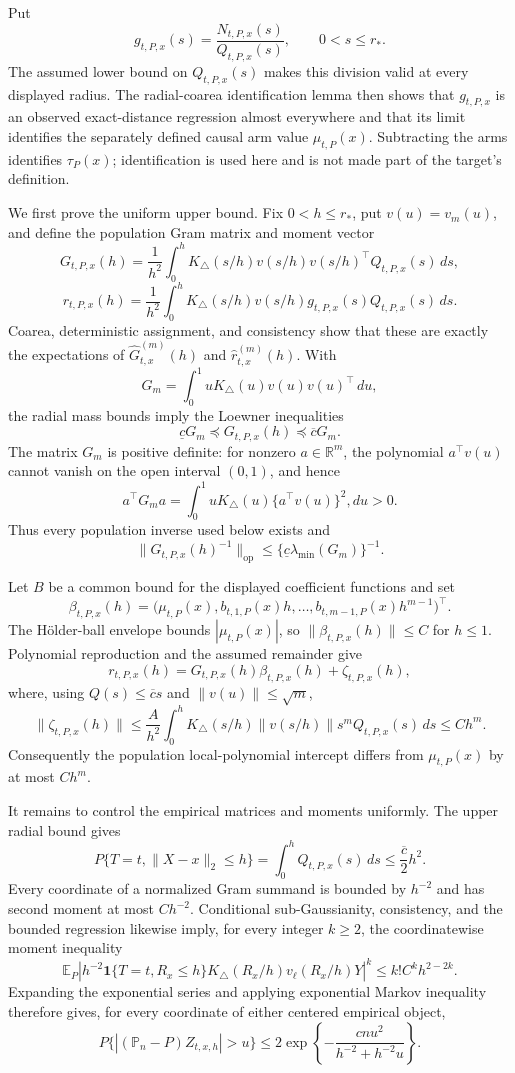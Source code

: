 Put
\[
 g_{t,P,x}(s)=\frac{N_{t,P,x}(s)}{Q_{t,P,x}(s)},
 \qquad 0<s\leq r_*.
\]
The assumed lower bound on \(Q_{t,P,x}(s)\) makes this division valid at every displayed radius.  The radial-coarea identification lemma then shows that \(g_{t,P,x}\) is an observed exact-distance regression almost everywhere and that its limit identifies the separately defined causal arm value \(\mu_{t,P}(x)\).  Subtracting the arms identifies \(\tau_P(x)\); identification is used here and is not made part of the target's definition.

We first prove the uniform upper bound.  Fix \(0<h\leq r_*\), put \(v(u)=v_m(u)\), and define the population Gram matrix and moment vector
\[
 G_{t,P,x}(h)=\frac1{h^2}\int_0^hK_\triangle(s/h)v(s/h)v(s/h)^\top Q_{t,P,x}(s)\,ds,
\]
\[
 r_{t,P,x}(h)=\frac1{h^2}\int_0^hK_\triangle(s/h)v(s/h)g_{t,P,x}(s)Q_{t,P,x}(s)\,ds.
\]
Coarea, deterministic assignment, and consistency show that these are exactly the expectations of \(\widehat G^{(m)}_{t,x}(h)\) and \(\widehat r^{(m)}_{t,x}(h)\).  With
\[
 G_m=\int_0^1uK_\triangle(u)v(u)v(u)^\top\,du,
\]
the radial mass bounds imply the Loewner inequalities
\[
 \underline cG_m\preceq G_{t,P,x}(h)\preceq\overline cG_m.
\]
The matrix \(G_m\) is positive definite: for nonzero \(a\in\mathbb R^m\), the polynomial \(a^\top v(u)\) cannot vanish on the open interval \((0,1)\), and hence
\[
 a^\top G_ma=\int_0^1uK_\triangle(u)\{a^\top v(u)\}^2,du>0.
\]
Thus every population inverse used below exists and
\[
 \lVert G_{t,P,x}(h)^{-1}\rVert_{\mathrm{op}}
 \leq\{\underline c\lambda_{\min}(G_m)\}^{-1}.
\]

Let \(B\) be a common bound for the displayed coefficient functions and set
\[
 \beta_{t,P,x}(h)=
 \bigl(\mu_{t,P}(x),b_{t,1,P}(x)h,\ldots,
 b_{t,m-1,P}(x)h^{m-1}\bigr)^\top.
\]
The H\"older-ball envelope bounds \(|\mu_{t,P}(x)|\), so \(\|\beta_{t,P,x}(h)\|\leq C\) for \(h\leq1\).  Polynomial reproduction and the assumed remainder give
\[
 r_{t,P,x}(h)=G_{t,P,x}(h)\beta_{t,P,x}(h)+\zeta_{t,P,x}(h),
\]
where, using \(Q(s)\leq\overline cs\) and \(\|v(u)\|\leq\sqrt m\),
\[
 \|\zeta_{t,P,x}(h)\|
 \leq\frac{A}{h^2}\int_0^hK_\triangle(s/h)\|v(s/h)\|s^mQ_{t,P,x}(s)\,ds
 \leq C h^m.
\]
Consequently the population local-polynomial intercept differs from \(\mu_{t,P}(x)\) by at most \(Ch^m\).

It remains to control the empirical matrices and moments uniformly.  The upper radial bound gives
\[
 P\{T=t,\lVert X-x\rVert_2\leq h\}
 =\int_0^hQ_{t,P,x}(s)\,ds\leq\frac{\overline c}{2}h^2.
\]
Every coordinate of a normalized Gram summand is bounded by \(h^{-2}\) and has second moment at most \(Ch^{-2}\).  Conditional sub-Gaussianity, consistency, and the bounded regression likewise imply, for every integer \(k\geq2\), the coordinatewise moment inequality
\[
 \mathbb E_P\left|h^{-2}\mathbf1\{T=t,R_x\leq h\}
 K_\triangle(R_x/h)v_\ell(R_x/h)Y\right|^k
 \leq k!C^kh^{2-2k}.
\]
Expanding the exponential series and applying exponential Markov inequality therefore gives, for every coordinate of either centered empirical object,
\[
 P\{|(\mathbb P_n-P)Z_{t,x,h}|>u\}
 \leq2\exp\!\left\{-\frac{cnu^2}{h^{-2}+h^{-2}u}\right\}.
\]

